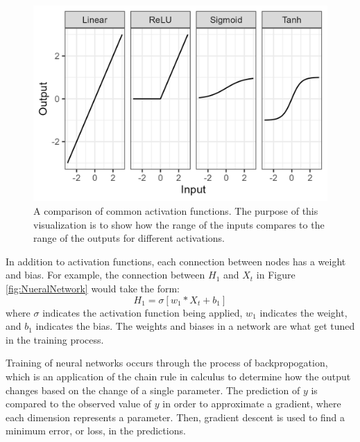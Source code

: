 \begin{figure}[ht]
    \centering
    \includegraphics[width=0.8\linewidth]{"Figures/Activations.png"}
    \caption{A comparison of common activation functions. The purpose of this visualization is to show how the range of the inputs compares to the range of the outputs for different activations.}
    \label{fig:Activations}
\end{figure}

In addition to activation functions, each connection between nodes has a weight and bias. For example, the connection between $H_1$ and $X_t$ in Figure \ref{fig:NueralNetwork} would take the form:
\begin{equation*}
    H_1 = \sigma[w_1*X_t + b_1]
\end{equation*}
where $\sigma$ indicates the activation function being applied, $w_1$ indicates the weight, and $b_1$ indicates the bias. The weights and biases in a network are what get tuned in the training process.

Training of neural networks occurs through the process of backpropogation, which is an application of the chain rule in calculus to determine how the output changes based on the change of a single parameter. The prediction of $y$ is compared to the observed value of $y$ in order to approximate a gradient, where each dimension represents a parameter. Then, gradient descent is used to find a minimum error, or loss, in the predictions.